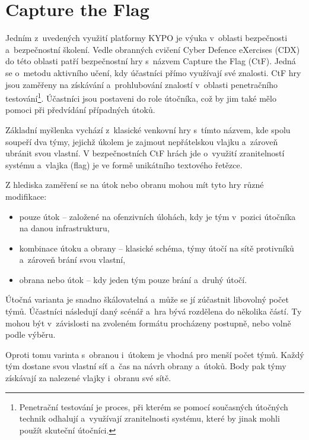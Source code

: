 \documentclass[
  digital, %
  oneside, %
  table,   %
  nolof,     %
  nolot,     %
]{fithesis3}
\begin{document}
\section{Capture the Flag}
Jedním z~uvedených využití platformy KYPO je výuka v~oblasti bezpečnosti a~bezpečnostní školení. Vedle obranných cvičení Cyber Defence eXercises (CDX) do této oblasti patří bezpečnostní hry s~názvem Capture the Flag (CtF). \cite{ctfDesign} Jedná se o~metodu aktivního učení, kdy účastníci přímo využívají své znalosti. CtF hry jsou zaměřeny na získávání a~prohlubování znalostí v~oblasti penetračního testování\footnote{Penetrační testování je proces, při kterém se pomocí současných útočných technik odhalují a~využívají zranitelnosti systému, které by jinak mohli použít skuteční útočníci.}. Účastníci jsou postaveni do role útočníka, což by jim také mělo pomoci při předvídání případných útoků. \cite{lessons2015, ctfDesign}\par
Základní myšlenka vychází z~klasické venkovní hry s~tímto názvem, kde spolu soupeří dva týmy, jejichž úkolem je zajmout nepřátelskou vlajku a~zároveň ubránit svou vlastní. V bezpečnostních CtF hrách jde o~využití zranitelností systému a~vlajka (flag) je ve formě unikátního textového řetězce.\par
Z hlediska zaměření se na útok nebo obranu mohou mít tyto hry různé modifikace: \cite{Dankovcikova2015thesis, ctfDesign}
\begin{itemize}
  \item pouze útok – založené na ofenzivních úlohách, kdy je tým v~pozici útočníka na danou infrastrukturu,
  \item kombinace útoku a obrany – klasické schéma, týmy útočí na sítě protivníků a~zároveň brání svou vlastní,
  \item obrana nebo útok – kdy jeden tým pouze brání a~druhý útočí.
\end{itemize}
Útočná varianta je snadno škálovatelná a~může se jí zúčastnit libovolný počet týmů. Účastníci následují daný scénář a~hra bývá rozdělena do několika částí. Ty mohou být v~závislosti na zvoleném formátu procházeny postupně, nebo volně podle výběru.\par
Oproti tomu varinta s~obranou i~útokem je vhodná pro menší počet týmů. Každý tým dostane svou vlastní síť a~čas na návrh obrany a~útoků. Body pak týmy získávají za nalezené vlajky i~obranu své sítě. \cite{Masarik2017thesis}
\end{document}
